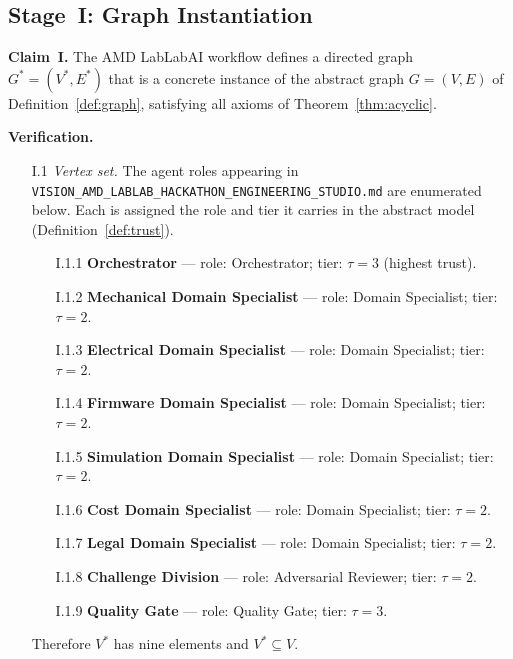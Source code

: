 \documentclass[12pt]{article}
\theoremstyle{definition}
\newcommand{\code}[1]{\texttt{#1}}
\newcommand{\VisionHackathon}{\code{VISION\_AMD\_\allowbreak LABLAB\_\allowbreak HACKATHON\_\allowbreak ENGINEERING\_STUDIO.md}}
\begin{document}
\subsection{Stage~I: Graph Instantiation}
\label{sec:case-study-graph}

\noindent\textbf{Claim~I.} The AMD LabLabAI workflow defines a directed
graph $G^{*} = (V^{*}, E^{*})$ that is a concrete instance of the abstract
graph $G = (V, E)$ of Definition~\ref{def:graph}, satisfying all axioms
of Theorem~\ref{thm:acyclic}.

\medskip
\noindent\textbf{Verification.}
\begin{enumerate}
    \item[I.1] \emph{Vertex set.}  The agent roles appearing in
               \VisionHackathon{} are enumerated below.  Each is
               assigned the role and tier it carries in the abstract model
               (Definition~\ref{def:trust}).
               \begin{enumerate}
                   \item[I.1.1] \textbf{Orchestrator} --- role: Orchestrator;
                                tier: $\tau = 3$ (highest trust).
                   \item[I.1.2] \textbf{Mechanical Domain Specialist} ---
                                role: Domain Specialist; tier: $\tau = 2$.
                   \item[I.1.3] \textbf{Electrical Domain Specialist} ---
                                role: Domain Specialist; tier: $\tau = 2$.
                   \item[I.1.4] \textbf{Firmware Domain Specialist} ---
                                role: Domain Specialist; tier: $\tau = 2$.
                   \item[I.1.5] \textbf{Simulation Domain Specialist} ---
                                role: Domain Specialist; tier: $\tau = 2$.
                   \item[I.1.6] \textbf{Cost Domain Specialist} ---
                                role: Domain Specialist; tier: $\tau = 2$.
                   \item[I.1.7] \textbf{Legal Domain Specialist} ---
                                role: Domain Specialist; tier: $\tau = 2$.
                   \item[I.1.8] \textbf{Challenge Division} ---
                                role: Adversarial Reviewer; tier: $\tau = 2$.
                   \item[I.1.9] \textbf{Quality Gate} ---
                                role: Quality Gate; tier: $\tau = 3$.
               \end{enumerate}
               Therefore $V^{*}$ has nine elements and $V^{*} \subseteq V$. \checkmark


\end{enumerate}
\end{document}
